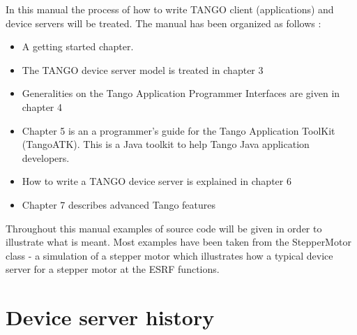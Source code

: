In this manual the process of how to write TANGO client (applications)
and device servers will be treated. The manual has been organized
as follows :
\begin{itemize}
\item A getting started chapter. 
\item The TANGO device server model is treated in chapter 3 
\item Generalities on the Tango Application Programmer Interfaces are given
in chapter 4 
\item Chapter 5 is an a programmer's guide for the Tango Application ToolKit
(TangoATK). This is a Java toolkit to help Tango Java application
developers. 
\item How to write a TANGO device server is explained in chapter 6 
\item Chapter 7 describes advanced Tango features 
\end{itemize}
Throughout this manual examples of source code will be given in order
to illustrate what is meant. Most examples have been taken from the
StepperMotor class - a simulation of a stepper motor which illustrates
how a typical device server for a stepper motor at the ESRF functions.

\section{Device server history}

